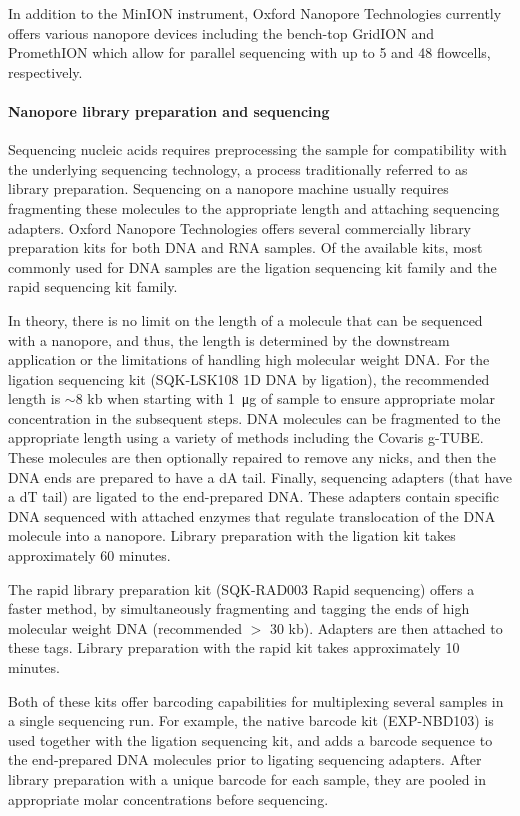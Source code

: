 In addition to the MinION instrument, Oxford Nanopore Technologies
currently offers various nanopore devices including the bench-top
GridION and PromethION which allow for parallel sequencing with up to 5
and 48 flowcells, respectively.


\paragraph{Nanopore library preparation and sequencing}
Sequencing nucleic acids requires preprocessing the sample for
compatibility with the underlying sequencing technology, a process
traditionally referred to as library preparation.
%
Sequencing on a nanopore machine usually requires fragmenting these
molecules to the appropriate length and attaching sequencing adapters.
%
Oxford Nanopore Technologies offers several commercially library
preparation kits for both DNA and RNA samples.  Of the available kits,
most commonly used for DNA samples are the ligation sequencing kit
family and the rapid sequencing kit family.

In theory, there is no limit on the length of a molecule that can be
sequenced with a nanopore, and thus, the length is determined by the
downstream application or the limitations of handling high molecular
weight DNA. For the ligation sequencing kit (SQK-LSK108 1D DNA by
ligation), the recommended length is $\sim$8 kb when starting with
\SI{1}{\micro\gram} of sample to ensure appropriate molar concentration
in the subsequent steps.  DNA molecules can be fragmented to the
appropriate length using a variety of methods including the Covaris
g-TUBE.
%
These molecules are then optionally repaired to remove any nicks, and
then the DNA ends are prepared to have a dA tail. Finally, sequencing
adapters (that have a dT tail) are ligated to the end-prepared DNA.
These adapters contain specific DNA sequenced with attached enzymes that
regulate translocation of the DNA molecule into a nanopore.  Library
preparation with the ligation kit takes approximately 60 minutes.

The rapid library preparation kit (SQK-RAD003 Rapid sequencing) offers a
faster method, by simultaneously fragmenting and tagging the ends of
high molecular weight DNA (recommended $>$ 30 kb). Adapters are then
attached to these tags.  Library preparation with the rapid kit takes
approximately 10 minutes.

Both of these kits offer barcoding capabilities for multiplexing several
samples in a single sequencing run. For example, the native barcode kit
(EXP-NBD103) is used together with the ligation sequencing kit, and
adds a barcode sequence to the end-prepared DNA molecules prior to
ligating sequencing adapters. After library preparation with a unique
barcode for each sample, they are pooled in appropriate molar
concentrations before sequencing.

